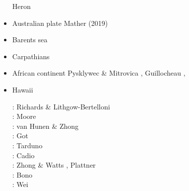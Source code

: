\begin{itemize}
\begin{scriptsize}
Heron \etal \cite{heps18}
\end{scriptsize}


\item Australian plate 
{\scriptsize
\cite{himu03}\cite{wemv03}\cite{pymi03}\cite{onml03}
\cite{onmj05}
\cite{hazs10}\cite{dimg10}
\cite{mahg11}\cite{digm11}
\cite{gosk14}
\cite{scsp15}
Mather \etal (2019) \cite{mamr19}
}
\item Barents sea 
{\scriptsize
\cite{buto07b}
\cite{gahs13}
\cite{gahs14}
}
\item Carpathians 
{\scriptsize
\cite{clbm04}
\cite{isms05}
\cite{nehe06}
\cite{sepg19}
}
\item African continent 
{\scriptsize
\cite{gikb94}
Pysklywec \& Mitrovica \cite{pymi99},
\cite{vabt11}
\cite{busm12}
\cite{gagb14}
\cite{wakc17}
Guillocheau \etal \cite{gusb18},
\cite{cels20}
}
\item Hawaii 

\begin{scriptsize}
\nineteenninetysix: Richards \& Lithgow-Bertelloni \cite{rili96}\\
\nineteenninetyeight: Moore \etal \cite{most98}\\
\twothousandthree: van Hunen \& Zhong \cite{vazh03}\\
\twothousandeight: Got \etal \cite{gomm08}\\
\twothousandnine: Tarduno \etal \cite{tabs09}\\
\twothousandtwelve: Cadio \etal \cite{cabp12}\\
\twothousandthirteen: Zhong \& Watts \cite{zhwa13}, Plattner \etal \cite{plab13}\\
\twothousandnineteen: Bono \etal \cite{botb19}\\
\twothousandtwenty: Wei \etal \cite{wesl20}
\end{scriptsize}


\end{itemize}
